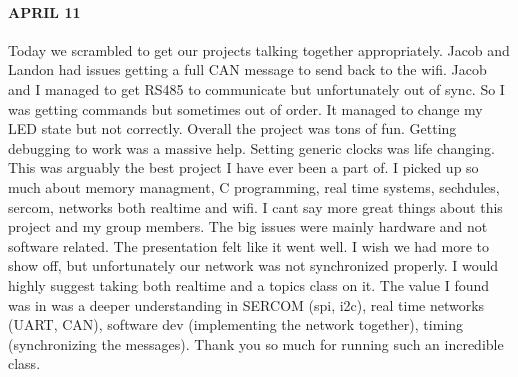 \documentclass{article}
\begin{document}
\paragraph{APRIL 11} Today we scrambled to get our projects talking together appropriately. Jacob and Landon had issues getting a full CAN message to send back to the wifi. Jacob and I managed to get RS485 to communicate but unfortunately out of sync. So I was getting commands but sometimes out of order. It managed to change my LED state but not correctly. Overall the project was tons of fun. Getting debugging to work was a massive help. Setting generic clocks was life changing. This was arguably the best project I have ever been a part of. I picked up so much about memory managment, C programming, real time systems, sechdules, sercom, networks both realtime and wifi. I cant say more great things about this project and my group members. The big issues were mainly hardware and not software related. The presentation felt like it went well. I wish we had more to show off, but unfortunately our network was not synchronized properly. I would highly suggest taking both realtime and a topics class on it. The value I found was in was a deeper understanding in SERCOM (spi, i2c), real time networks (UART, CAN), software dev (implementing the network together), timing (synchronizing the messages). Thank you so much for running such an incredible class.



\end{document}
